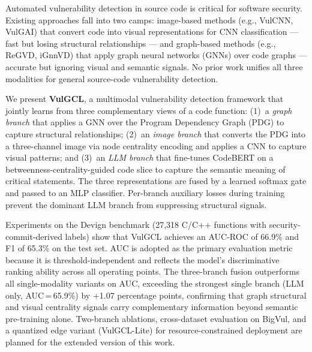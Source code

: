 Automated vulnerability detection in source code is critical for software
security. Existing approaches fall into two camps: image-based methods
(e.g., VulCNN, VulGAI) that convert code into visual representations for
CNN classification — fast but losing structural relationships — and graph-based
methods (e.g., ReGVD, iGnnVD) that apply graph neural networks (GNNs) over
code graphs — accurate but ignoring visual and semantic signals. No prior work
unifies all three modalities for general source-code vulnerability detection.

We present \textbf{VulGCL}, a multimodal vulnerability detection framework that
jointly learns from three complementary views of a code function: (1)~a
\emph{graph branch} that applies a GNN over the Program Dependency Graph (PDG)
to capture structural relationships; (2)~an \emph{image branch} that converts
the PDG into a three-channel image via node centrality encoding and applies a
CNN to capture visual patterns; and (3)~an \emph{LLM branch} that fine-tunes
CodeBERT on a betweenness-centrality-guided code slice to capture the semantic
meaning of critical statements. The three representations are fused by a learned
softmax gate and passed to an MLP classifier. Per-branch auxiliary losses during
training prevent the dominant LLM branch from suppressing structural signals.

Experiments on the Devign benchmark (27,318 C/C++ functions with
security-commit-derived labels) show that VulGCL achieves an AUC-ROC of 66.9\%
and F1 of 65.3\% on the test set. AUC is adopted as the primary evaluation
metric because it is threshold-independent and reflects the model's discriminative
ranking ability across all operating points. The three-branch fusion outperforms
all single-modality variants on AUC, exceeding the strongest single branch
(LLM only, AUC\,=\,65.9\%) by $+$1.07 percentage points, confirming that graph
structural and visual centrality signals carry complementary information beyond
semantic pre-training alone. Two-branch ablations, cross-dataset evaluation on
BigVul, and a quantized edge variant (VulGCL-Lite) for resource-constrained
deployment are planned for the extended version of this work.
